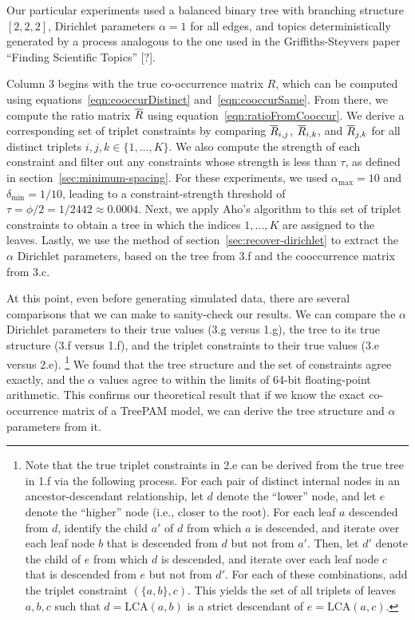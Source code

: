 \documentclass{article}
\theoremstyle{definition}
\newcommand{\deltaMin}{\delta_{\text{min}}}
\newcommand{\alphaMax}{\alpha_{\text{max}}}
\newcommand{\LCA}{\text{LCA}}
\newcommand{\tocite}{[?]}
\begin{document}
Our particular experiments used a balanced binary tree with branching structure $[2,2,2]$, Dirichlet parameters $\alpha = 1$ for all edges, and topics deterministically generated by a process analogous to the one used in the Griffiths-Steyvers paper ``Finding Scientific Topics'' \tocite{}.

Column 3 begins with the true co-occurrence matrix $R$, which can be computed using equations~\eqref{eqn:cooccurDistinct} and~\eqref{eqn:cooccurSame}.
From there, we compute the ratio matrix $\overline{R}$ using equation~\eqref{eqn:ratioFromCooccur}.
We derive a corresponding set of triplet constraints by comparing $\overline{R}_{i,j}$, $\overline{R}_{i,k}$, and $\overline{R}_{j,k}$ for all distinct triplets $i,j,k \in \{1, \ldots, K\}$.
We also compute the strength of each constraint and filter out any constraints whose strength is less than $\tau$, as defined in section~\ref{sec:minimum-spacing}.
For these experiments, we used $\alphaMax = 10$ and $\deltaMin = 1/10$, leading to a constraint-strength threshold of $\tau = \phi/2 = 1/2442 \approx 0.0004$.
Next, we apply Aho's algorithm to this set of triplet constraints to obtain a tree in which the indices $1, \ldots, K$ are assigned to the leaves.
Lastly, we use the method of section~\ref{sec:recover-dirichlet} to extract the $\alpha$ Dirichlet parameters, based on the tree from 3.f and the cooccurrence matrix from 3.c.

At this point, even before generating simulated data, there are several comparisons that we can make to sanity-check our results.
We can compare the $\alpha$ Dirichlet parameters to their true values (3.g versus 1.g), the tree to its true structure (3.f versus 1.f), and the triplet constraints to their true values (3.e versus 2.e).%
\footnote{%
Note that the true triplet constraints in 2.e can be derived from the true tree in 1.f via the following process.
For each pair of distinct internal nodes in an ancestor-descendant relationship, let $d$ denote the ``lower'' node, and let $e$ denote the ``higher'' node (i.e., closer to the root).
For each leaf $a$ descended from $d$, identify the child $a'$ of $d$ from which $a$ is descended, and iterate over each leaf node $b$ that is descended from $d$ but not from $a'$.
Then, let $d'$ denote the child of $e$ from which $d$ is descended, and iterate over each leaf node $c$ that is descended from $e$ but not from $d'$.
For each of these combinations, add the triplet constraint $(\{a,b\}, c)$.
This yields the set of all triplets of leaves $a,b,c$ such that $d=\LCA(a,b)$ is a strict descendant of $e=\LCA(a,c)$.}
We found that the tree structure and the set of constraints agree exactly, and the $\alpha$ values agree to within the limits of 64-bit floating-point arithmetic.
This confirms our theoretical result that if we know the exact co-occurrence matrix of a TreePAM model, we can derive the tree structure and $\alpha$ parameters from it.
\end{document}
